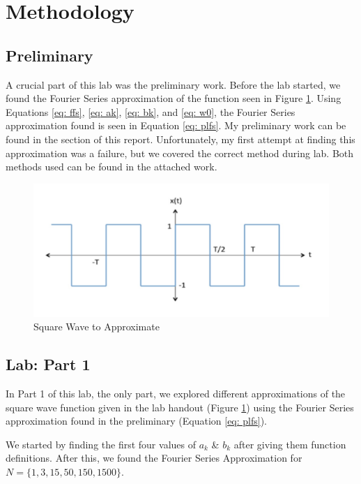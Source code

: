 \documentclass[12pt]{report}
\begin{document}
\section{Methodology}
\subsection{Preliminary}\label{Section: Preliminary}
A crucial part of this lab was the preliminary work. Before the lab started, we found the Fourier Series approximation of the function seen in Figure \ref{fig: pre}.
Using Equations \eqref{eq: ffs}, \eqref{eq: ak}, \eqref{eq: bk}, and \eqref{eq: w0}, the Fourier Series approximation found is seen in Equation \eqref{eq: plfs}. 
My preliminary work can be found in the  section of this report. Unfortunately, my first attempt at finding this approximation was 
a failure, but we covered the correct method during lab. Both methods used can be found in the attached work.

\begin{figure}[h!]
  \centering
  \includegraphics[scale=.7]{pre.png}
  \caption{Square Wave to Approximate}
  \label{fig: pre}
\end{figure}

\subsection{Lab: Part 1}\label{Section: Part1}
In Part 1 of this lab, the only part, we explored different approximations of the square wave function given in the lab handout (Figure \ref{fig: pre}) using the 
Fourier Series approximation found in the preliminary (Equation \eqref{eq: plfs}). 

We started by finding the first four values of $a_k$ \& $b_k$ after giving them function definitions. After this, we found the Fourier Series Approximation for
$N = \{1, 3, 15, 50, 150, 1500\}$. 
\end{document}
